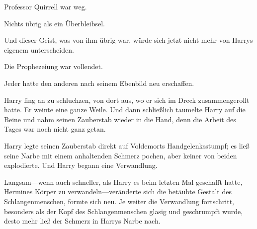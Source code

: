 Professor Quirrell war weg.

Nichts übrig als ein Überbleibsel.

Und dieser Geist, was von ihm übrig war, würde sich jetzt nicht mehr von Harrys eigenem unterscheiden.

Die Prophezeiung war vollendet.

Jeder hatte den anderen nach seinem Ebenbild neu erschaffen.

Harry fing an zu schluchzen, von dort aus, wo er sich im Dreck zusammengerollt hatte.
Er weinte eine ganze Weile.
Und dann schließlich taumelte Harry auf die Beine und nahm seinen Zauberstab wieder in die Hand, denn die Arbeit des Tages war noch nicht ganz getan.

\later

Harry legte seinen Zauberstab direkt auf Voldemorts Handgelenksstumpf; es ließ seine Narbe mit einem anhaltenden Schmerz pochen, aber keiner von beiden explodierte. Und Harry begann eine Verwandlung.

Langsam—wenn auch schneller, als Harry es beim letzten Mal geschafft hatte, Hermines Körper zu verwandeln—veränderte sich die betäubte Gestalt des Schlangenmenschen, formte sich neu. Je weiter die Verwandlung fortschritt, besonders als der Kopf des Schlangenmenschen glasig und geschrumpft wurde, desto mehr ließ der Schmerz in Harrys Narbe nach.

